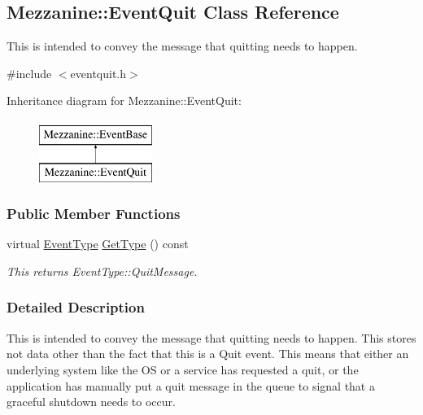 \hypertarget{classMezzanine_1_1EventQuit}{
\subsection{Mezzanine::EventQuit Class Reference}
\label{classMezzanine_1_1EventQuit}
}


This is intended to convey the message that quitting needs to happen.  




{\ttfamily \#include $<$eventquit.h$>$}

Inheritance diagram for Mezzanine::EventQuit:\begin{figure}[H]
\begin{center}
\leavevmode
\includegraphics[height=2.000000cm]{classMezzanine_1_1EventQuit}
\end{center}
\end{figure}
\subsubsection*{Public Member Functions}
\begin{DoxyCompactItemize}
\item 
virtual \hyperlink{classMezzanine_1_1EventBase_ab85e31e97753b7e7ecb098f82526baef}{EventType} \hyperlink{classMezzanine_1_1EventQuit_adffd297e6d7ca09cfde8df0f08da5e31}{GetType} () const 
\begin{DoxyCompactList}\small\item\em This returns EventType::QuitMessage. \item\end{DoxyCompactList}\end{DoxyCompactItemize}


\subsubsection{Detailed Description}
This is intended to convey the message that quitting needs to happen. This stores not data other than the fact that this is a Quit event. This means that either an underlying system like the OS or a service has requested a quit, or the application has manually put a quit message in the queue to signal that a graceful shutdown needs to occur. 

